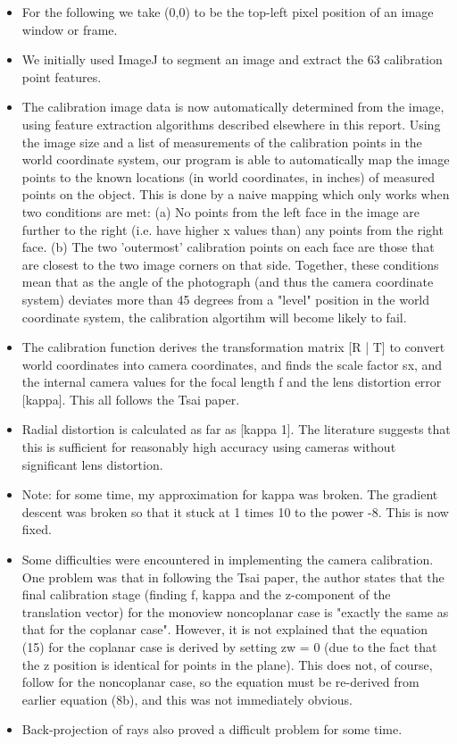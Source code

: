\begin{itemize}
  \item For the following we take (0,0) to be the top-left pixel position of an image window or frame.
  \item We initially used ImageJ to segment an image and extract the 63 calibration point features.
  \item The calibration image data is now automatically determined from the image, using feature extraction algorithms described elsewhere in this report. Using the image size and a list of measurements of the calibration points in the world coordinate system, our program is able to automatically map the image points to the known locations (in world coordinates, in inches) of measured points on the object. This is done by a naive mapping which only works when two conditions are met: (a) No points from the left face in the image are further to the right (i.e. have higher x values than) any points from the right face. (b) The two 'outermost' calibration points on each face are those that are closest to the two image corners on that side. Together, these conditions mean that as the angle of the photograph (and thus the camera coordinate system) deviates more than 45 degrees from a "level" position in the world coordinate system, the calibration algortihm will become likely to fail.
  \item The calibration function derives the transformation matrix [R | T] to convert world coordinates into camera coordinates, and finds the scale factor sx, and the internal camera values for the focal length f and the lens distortion error [kappa]. This all follows the Tsai paper.
  \item Radial distortion is calculated as far as [kappa 1]. The literature suggests that this is sufficient for reasonably high accuracy using cameras without significant lens distortion.
  \item Note: for some time, my approximation for kappa was broken. The gradient descent was broken so that it stuck at 1 times 10 to the power -8. This is now fixed.
  \item Some difficulties were encountered in implementing the camera calibration. One problem was that in following the Tsai paper, the author states that the final calibration stage (finding f, kappa and the z-component of the translation vector) for the monoview noncoplanar case is "exactly the same as that for the coplanar case". However, it is not explained that the equation (15) for the coplanar case is derived by setting zw = 0 (due to the fact that the z position is identical for points in the plane). This does not, of course, follow for the noncoplanar case, so the equation must be re-derived from earlier equation (8b), and this was not immediately obvious.
  \item Back-projection of rays also proved a difficult problem for some time.
\end{itemize}
